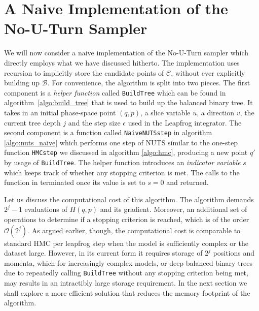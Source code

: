 \section{A Naive Implementation of the No-U-Turn Sampler}
We will now consider a naive implementation of the No-U-Turn sampler which directly employs what we have discussed hitherto.
The implementation uses recursion to implicitly store the candidate points of $\mathcal{C}$, without ever explicitly building up $\mathcal{B}$.
For convenience, the algorithm is split into two pieces. The first component is a \textit{helper function} called {\tt BuildTree} which can be found in algorithm~\ref{algo:build_tree} that is used to build up the balanced binary tree. It takes in an initial phase-space point $(q, p)$, a slice variable $u$, a direction $v$, the current tree depth $j$ and the step size $\epsilon$ used in the Leapfrog integrator.
The second component is a function called {\tt NaiveNUTSstep} in algorithm \ref{algo:nuts_naive} which performs one step of NUTS similar to the one-step function {\tt HMCstep} we discussed in algorithm \ref{algo:hmc}, producing
a new point $q'$ by usage of {\tt BuildTree}. The helper function introduces an \textit{indicator variable} $s$ which keeps track of whether any stopping criterion is met. The calls to the function in terminated once its value is set to $s = 0$ and returned.


Let us discuss the computational cost of this algorithm. The algorithm demands $2^j - 1$ evaluations of $H(q, p)$ and its gradient. Moreover, an additional set of
operations to determine if a stopping criterion is reached, which is of the order $\mathcal{O}(2^j)$. As argued earlier, though, the computational cost is comparable to standard HMC
per leapfrog step
when the model is sufficiently complex or the dataset large. However, in its current form it requires storage of $2^j$ positions and momenta, which for increasingly complex models,
or deep balanced binary trees due to repeatedly calling {\tt BuildTree} without any stopping criterion being met, may results in an intractibly large storage requirement. In the next section we shall explore a more efficient solution that reduces the memory footprint of the algorithm.


